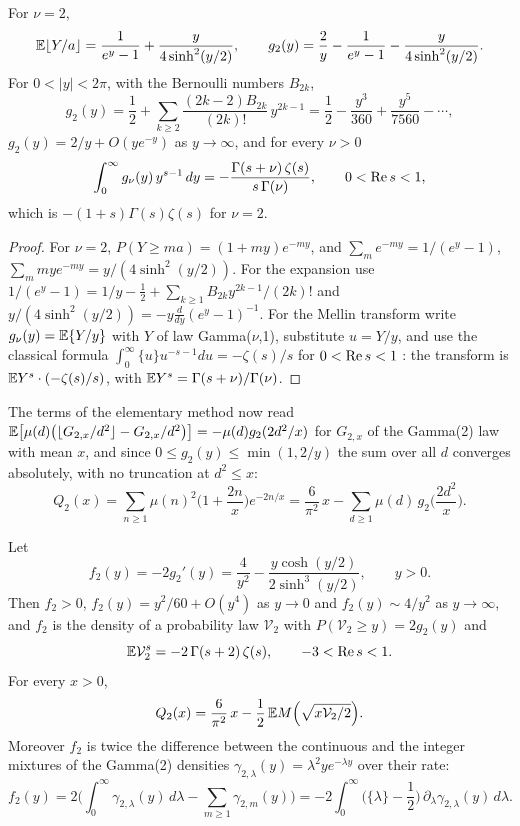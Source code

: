 \begin{lemma}\label{lem:sqfree:frac2}
For $\nu=2$,
\[
\mathbb{E}\lfloor Y/a\rfloor=\frac1{e^y-1}+\frac y{4\sinh^2(y/2)},\qquad g_2(y)=\frac2y-\frac1{e^y-1}-\frac y{4\sinh^2(y/2)} .
\]
For $0<|y|<2\pi$, with the Bernoulli numbers $B_{2k}$,
\[
g_2(y)=\frac12+\sum_{k\ge2}\frac{(2k-2)B_{2k}}{(2k)!}\,y^{2k-1}=\frac12-\frac{y^3}{360}+\frac{y^5}{7560}-\cdots,
\]
$g_2(y)=2/y+O(ye^{-y})$ as $y\to\infty$, and for every $\nu>0$
\[
\int_0^\infty g_\nu(y)\,y^{s-1}\,dy=-\frac{\Gamma(s+\nu)\,\zeta(s)}{s\,\Gamma(\nu)},\qquad 0<\operatorname{Re} s<1,
\]
which is $-(1+s)\Gamma(s)\zeta(s)$ for $\nu=2$.
\end{lemma}

\begin{proof}
For $\nu=2$, $P(Y\ge ma)=(1+my)e^{-my}$, and $\sum_me^{-my}=1/(e^y-1)$, $\sum_mmye^{-my}=y/(4\sinh^2(y/2))$. For the expansion use $1/(e^y-1)=1/y-\frac12+\sum_{k\ge1}B_{2k}y^{2k-1}/(2k)!$ and $y/(4\sinh^2(y/2))=-y\frac d{dy}(e^y-1)^{-1}$. For the Mellin transform write $g_\nu(y)=\mathbb{E}\{Y/y\}$ with $Y$ of law Gamma($\nu$,1), substitute $u=Y/y$, and use the classical formula $\int_0^\infty\{u\}u^{-s-1}du=-\zeta(s)/s$ for $0<\operatorname{Re} s<1$ \cite[Section~2.1]{Titchmarsh}: the transform is $\mathbb{E} Y^s\cdot(-\zeta(s)/s)$, with $\mathbb{E} Y^s=\Gamma(s+\nu)/\Gamma(\nu)$.
\end{proof}

The terms of the elementary method now read $\mathbb{E}\big[\mu(d)\big(\lfloor G_{2,x}/d^2\rfloor-G_{2,x}/d^2\big)\big]=-\mu(d)g_2(2d^2/x)$ for $G_{2,x}$ of the Gamma(2) law with mean $x$, and since $0\le g_2(y)\le\min(1,2/y)$ the sum over all $d$ converges absolutely, with no truncation at $d^2\le x$:
\begin{equation}\label{eq:sqfree:EQ}
Q_2(x)=\sum_{n\ge1}\mu(n)^2\Big(1+\frac{2n}x\Big)e^{-2n/x}=\frac6{\pi^2}\,x-\sum_{d\ge1}\mu(d)\,g_2\Big(\frac{2d^2}x\Big).
\end{equation}

\begin{theorem}\label{thm:sqfree:mertens}
Let
\[
f_2(y)=-2g_2'(y)=\frac4{y^2}-\frac{y\cosh(y/2)}{2\sinh^3(y/2)},\qquad y>0 .
\]
Then $f_2>0$, $f_2(y)=y^2/60+O(y^4)$ as $y\to0$ and $f_2(y)\sim4/y^2$ as $y\to\infty$, and $f_2$ is the density of a probability law $\mathcal V_2$ with $P(\mathcal V_2\ge y)=2g_2(y)$ and
\[
\mathbb{E}\mathcal V_2^s=-2\,\Gamma(s+2)\,\zeta(s),\qquad -3<\operatorname{Re} s<1 .
\]
For every $x>0$,
\[
Q_2(x)=\frac6{\pi^2}\,x-\frac12\,\mathbb{E} M\Big(\sqrt{x\mathcal V_2/2}\Big).
\]
Moreover $f_2$ is twice the difference between the continuous and the integer mixtures of the Gamma(2) densities $\gamma_{2,\lambda}(y)=\lambda^2ye^{-\lambda y}$ over their rate:
\[
f_2(y)=2\Big(\int_0^\infty\gamma_{2,\lambda}(y)\,d\lambda-\sum_{m\ge1}\gamma_{2,m}(y)\Big)=-2\int_0^\infty\Big(\{\lambda\}-\frac12\Big)\,\partial_\lambda\gamma_{2,\lambda}(y)\,d\lambda .
\]
\end{theorem}


